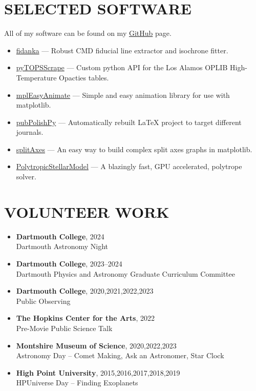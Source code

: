 \documentclass[margin, 10pt]{res} %
\begin{document}
\begin{resume}
\section{SELECTED SOFTWARE}
All of my software can be found on my \href{https://github.com/tboudreaux}{GitHub} page.
\begin{itemize}
	\item \href{https://github.com/tboudreaux/fidanka}{fidanka} --- Robust CMD fiducial line extractor and isochrone fitter.
	\item \href{https://github.com/tboudreaux/pytopsscrape}{pyTOPSScrape} --- Custom python API for the Los Alamos OPLIB High-Temperature Opacties tables.
	\item \href{https://github.com/tboudreaux/mpl_animate}{mplEasyAnimate} --- Simple and easy animation library for use with matplotlib.
	\item \href{https://github.com/tboudreaux/PubPolishPy}{pubPolishPy} --- Automatically rebuilt LaTeX project to target different journals.
	\item \href{https://github.com/tboudreaux/splitAxes}{splitAxes} --- An easy way to build complex split axes graphs in matplotlib.
	\item \href{https://github.com/tboudreaux/PolytropicStellarModel}{PolytropicStellarModel} --- A blazingly fast, GPU accelerated, polytrope solver.
\end{itemize}

\section{VOLUNTEER WORK}
\begin{itemize}
	\item {\scriptsize \textbf{Dartmouth College}}, {\small 2024} \\ Dartmouth Astronomy Night
	\item {\scriptsize \textbf{Dartmouth College}}, {\small 2023--2024} \\ Dartmouth Physics and Astronomy Graduate Curriculum Committee 
	\item {\scriptsize \textbf{Dartmouth College}}, {\small 2020,2021,2022,2023} \\ Public Observing
	\item {\scriptsize \textbf{The Hopkins Center for the Arts}}, {\small 2022} \\ Pre-Movie Public Science Talk
	\item {\scriptsize \textbf{Montshire Museum of Science}}, {\small 2020,2022,2023} \\ Astronomy Day -- Comet Making, Ask an Astronomer, Star Clock
	\item {\scriptsize \textbf{High Point University}}, {\small 2015,2016,2017,2018,2019} \\ HPUniverse Day -- Finding Exoplanets
\end{itemize}


\end{resume}
\end{document}

